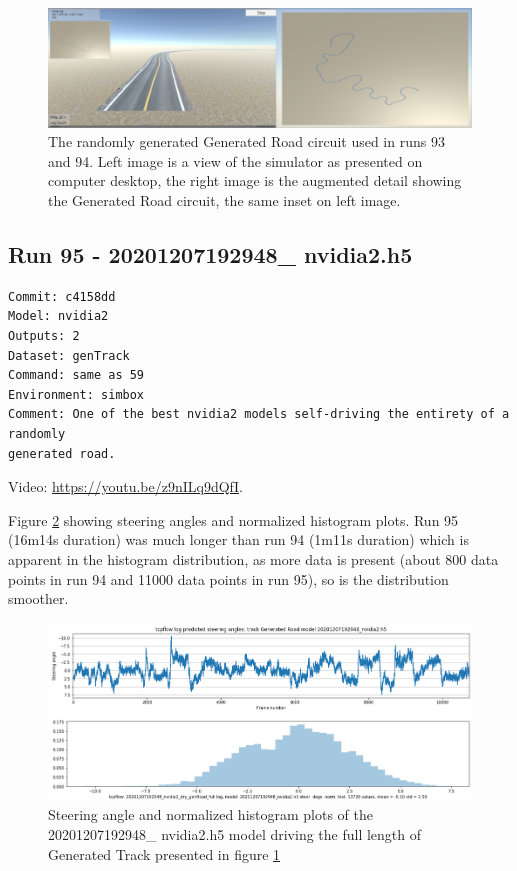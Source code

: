 \begin{figure}[ht]
 \centering 
 \includegraphics[width=\textwidth]{Figures/run-93-94-generated-road.png}
 \caption{The randomly generated Generated Road circuit used in runs 93 and 94. Left image is a view of the simulator as presented on computer desktop, the right image is the augmented detail showing the Generated Road circuit, the same inset on left image.}
 \label{fig:run-93-94-generated-road} 
\end{figure}


\subsection{Run 95 - 20201207192948\_ nvidia2.h5 }
\label{app_res:95}
\begin{verbatim}
Commit: c4158dd
Model: nvidia2
Outputs: 2
Dataset: genTrack   
Command: same as 59
Environment: simbox
Comment: One of the best nvidia2 models self-driving the entirety of a randomly
generated road.

\end{verbatim}
Video: \url{https://youtu.be/z9nILq9dQfI}.

Figure \ref{fig:20201207192948_nvidia2_dry_genRoad_full} showing steering angles and normalized histogram plots. Run 95 (16m14s duration) was much longer than run 94 (1m11s duration) which is apparent in the histogram distribution, as more data is present (about 800 data points in run 94 and 11000 data points in run 95), so is the distribution smoother.
\begin{figure}[ht]
 \centering 
 \includegraphics[width=\textwidth]{Figures/20201207192948_nvidia2_dry_genRoad_full.png}
 \caption{Steering angle and normalized histogram plots of the 20201207192948\_ nvidia2.h5 model driving the full length of Generated Track presented in figure \ref{fig:run-93-94-generated-road} }
 \label{fig:20201207192948_nvidia2_dry_genRoad_full} 
\end{figure}

